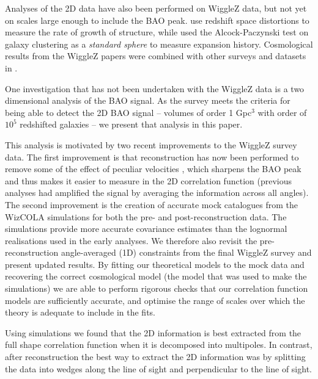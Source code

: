 \documentclass[iop,twocolappendix]{emulateapj}
\begin{document}
Analyses of the 2D data have also been performed on WiggleZ data, but not yet on scales large enough to include the BAO peak.  \citet{BlakeBroughColless2011,ContrerasBlake2013} use redshift space distortions to measure the rate of growth  of structure, while \citet{BlakeGlazebrook2011} used the Alcock-Paczynski test on galaxy clustering as a {\em standard sphere} to measure expansion history. Cosmological results from the WiggleZ papers were combined with other surveys and datasets in \citet{Parkinson2012}. %

One investigation that has not been undertaken with the WiggleZ data is a two dimensional analysis of the BAO signal.  As the survey meets the criteria for being able to detect the 2D BAO signal -- volumes of order 1 Gpc$^3$ with order of $10^5$ redshifted galaxies \citep{Tegmark1997,BlakeGlazebrook2003,BlakeParkinson2006} -- we present that analysis in this paper.  

This analysis is motivated by two recent improvements to the WiggleZ survey data.  The first improvement is that reconstruction has now been performed to remove some of the effect of peculiar velocities \citep{KazinKoda2014}, which sharpens the BAO peak and thus makes it  easier to measure in the 2D correlation function (previous analyses had amplified the signal by averaging the information across all angles).  The second improvement is the creation of accurate mock catalogues from the WizCOLA simulations \citep{KodaBlake2015} for both the pre- and post-reconstruction data. The simulations provide more accurate covariance estimates than the lognormal realisations used in the early analyses.  We therefore also revisit the pre-reconstruction angle-averaged (1D) constraints from the final WiggleZ survey and present updated results.  By fitting our theoretical models to the mock data and recovering the correct cosmological model (the model that was used to make the simulations) we are able to perform rigorous checks that our correlation function models are sufficiently accurate, and optimise the range of scales over which the theory is adequate to include in the fits.  

Using simulations we found that the 2D information is best extracted from the full shape correlation function when it is decomposed into multipoles.  In contrast, after reconstruction the best way to extract the 2D information was by splitting the data into wedges along the line of sight and perpendicular to the line of sight.
\end{document}
